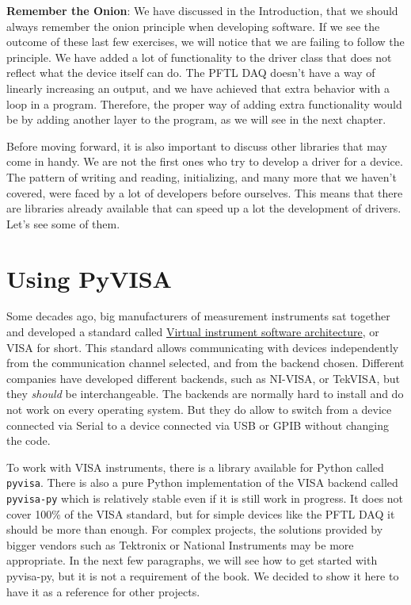 \textbf{Remember the Onion}: We have discussed in the Introduction, that we should always remember the onion principle when developing software. If we see the outcome of these last few exercises, we will notice that we are failing to follow the principle. We have added a lot of functionality to the driver class that does not reflect what the device itself can do. The {PFTL DAQ} doesn't have a way of linearly increasing an output, and we have achieved that extra behavior with a loop in a program. Therefore, the proper way of adding extra functionality would be by adding another layer to the program, as we will see in the next chapter.

Before moving forward, it is also important to discuss other libraries that may come in handy. We are not the first ones who try to develop a driver for a device. The pattern of writing and reading, initializing, and many more that we haven't covered, were faced by a lot of developers before ourselves. This means that there are libraries already available that can speed up a lot the development of drivers. Let's see some of them.

\section{Using PyVISA}\label{section:pyvisa}
Some decades ago, big manufacturers of measurement instruments sat together and developed a standard called \href{https://en.wikipedia.org/wiki/Virtual_instrument_software_architecture}{Virtual instrument software architecture}, or VISA for short. This standard allows communicating with devices independently from the communication channel selected, and from the backend chosen. Different companies have developed different backends, such as NI-VISA, or TekVISA, but they \emph{should} be interchangeable. The backends are normally hard to install and do not work on every operating system. But they do allow to switch from a device connected via Serial to a device connected via USB or GPIB without changing the code.

To work with VISA instruments, there is a library available for Python called \texttt{pyvisa}. There is also a pure Python implementation of the VISA backend called \texttt{pyvisa-py} which is relatively stable even if it is still work in progress. It does not cover 100\% of the VISA standard, but for simple devices like the {PFTL DAQ} it should be more than enough. For complex projects, the solutions provided by bigger vendors such as Tektronix or National Instruments may be more appropriate. In the next few paragraphs, we will see how to get started with pyvisa-py, but it is not a requirement of the book. We decided to show it here to have it as a reference for other projects.

